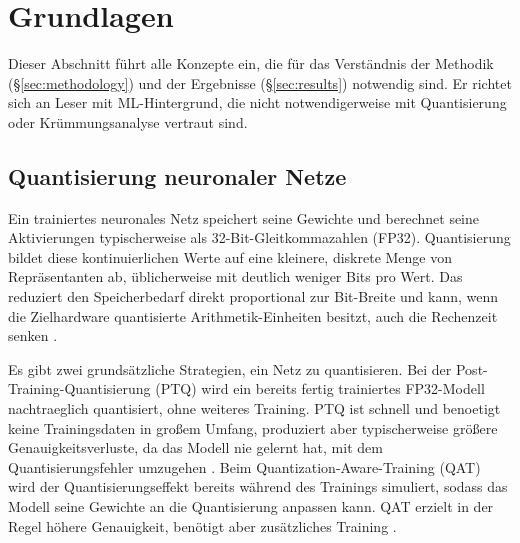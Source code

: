 \section{Grundlagen}
\label{sec:fundamentals}

Dieser Abschnitt führt alle Konzepte ein, die für das Verständnis der Methodik (\S\ref{sec:methodology}) und der Ergebnisse (\S\ref{sec:results}) notwendig sind. Er richtet sich an Leser mit ML-Hintergrund, die nicht notwendigerweise mit Quantisierung oder Krümmungsanalyse vertraut sind.

\subsection{Quantisierung neuronaler Netze}
\label{sec:fund-quant}

Ein trainiertes neuronales Netz speichert seine Gewichte und berechnet seine Aktivierungen typischerweise als 32-Bit-Gleitkommazahlen (FP32). Quantisierung bildet diese kontinuierlichen Werte auf eine kleinere, diskrete Menge von Repräsentanten ab, üblicherweise mit deutlich weniger Bits pro Wert. Das reduziert den Speicherbedarf direkt proportional zur Bit-Breite und kann, wenn die Zielhardware quantisierte Arithmetik-Einheiten besitzt, auch die Rechenzeit senken \citep{gholami2021survey, nagel2021whitepaper}. 
\par\medskip

Es gibt zwei grundsätzliche Strategien, ein Netz zu quantisieren. Bei der Post-Training-Quantisierung (PTQ) wird ein bereits fertig trainiertes FP32-Modell nachtraeglich quantisiert, ohne weiteres Training. PTQ ist schnell und benoetigt keine Trainingsdaten in großem Umfang, produziert aber typischerweise größere Genauigkeitsverluste, da das Modell nie gelernt hat, mit dem Quantisierungsfehler umzugehen \citep{nagel2021whitepaper}. Beim Quantization-Aware-Training (QAT) wird der Quantisierungseffekt bereits während des Trainings simuliert, sodass das Modell seine Gewichte an die Quantisierung anpassen kann. QAT erzielt in der Regel höhere Genauigkeit, benötigt aber zusätzliches Training \citep{gholami2021survey}.
\par\medskip

